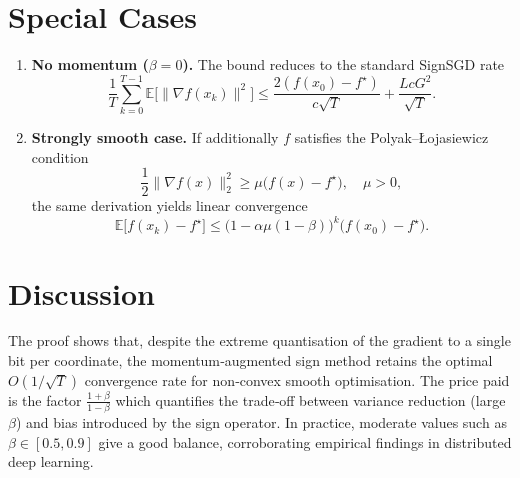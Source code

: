 \documentclass{article}
\newcommand{\E}{\mathbb{E}}
\begin{document}
\section*{Special Cases}
\begin{enumerate}[label=\arabic*)]
\item \textbf{No momentum ($\beta=0$).} The bound reduces to the standard SignSGD rate
\[
\frac{1}{T}\sum_{k=0}^{T-1}\E\!\big[\|\nabla f(x_{k})\|^{2}\big]
\le \frac{2(f(x_{0})-f^{\star})}{c\sqrt{T}}+\frac{L c G^{2}}{\sqrt{T}}.
\]

\item \textbf{Strongly smooth case.} If additionally $f$ satisfies the Polyak–Łojasiewicz condition
\[
\frac{1}{2}\|\nabla f(x)\|_{2}^{2}\ge \mu\big(f(x)-f^{\star}\big),\quad \mu>0,
\]
the same derivation yields linear convergence
\[
\E\big[f(x_{k})-f^{\star}\big]\le \big(1-\alpha\mu(1-\beta)\big)^{k}\big(f(x_{0})-f^{\star}\big).
\]
\end{enumerate}

\section*{Discussion}
The proof shows that, despite the extreme quantisation of the gradient to a single bit per coordinate, the momentum‑augmented sign method retains the optimal $O(1/\sqrt{T})$ convergence rate for non‑convex smooth optimisation. The price paid is the factor $\frac{1+\beta}{1-\beta}$ which quantifies the trade‑off between variance reduction (large $\beta$) and bias introduced by the sign operator. In practice, moderate values such as $\beta\in[0.5,0.9]$ give a good balance, corroborating empirical findings in distributed deep learning.

\end{document}
